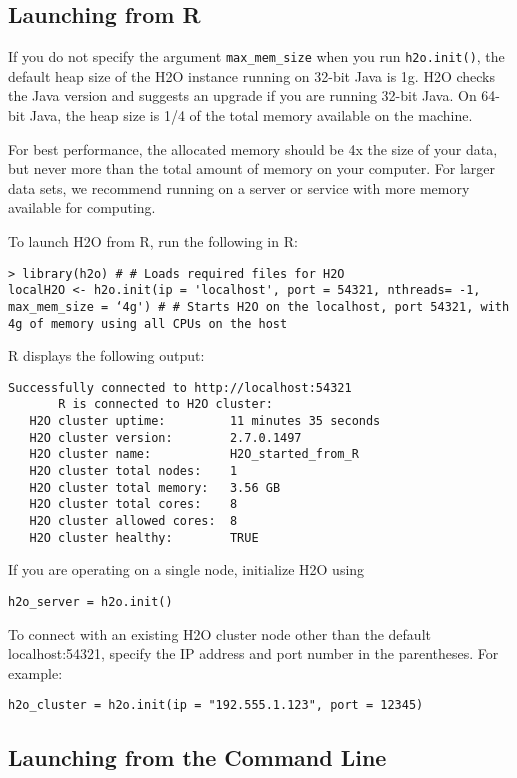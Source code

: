 \subsection{Launching from R}

If you do not specify the argument {\texttt{max\_mem\_size}} when you run {\texttt{h2o.init()}}, the default heap size of the H2O instance running on 32-bit Java is 1g. H2O checks the Java version and suggests an upgrade if you are running 32-bit Java. On 64-bit Java, the heap size is 1/4 of the total memory available on the machine. 

For best performance, the allocated memory should be 4x the size of your data, but never more than the total amount of memory on your computer. For larger data sets, we recommend running on a server or service with more memory available for computing.


To launch H2O from R, run the following in R:
\begin{lstlisting}[style=R]
> library(h2o) # # Loads required files for H2O
localH2O <- h2o.init(ip = 'localhost', port = 54321, nthreads= -1, max_mem_size = ‘4g') # # Starts H2O on the localhost, port 54321, with 4g of memory using all CPUs on the host 
\end{lstlisting} 


R displays the following output: 
\begin{lstlisting}[style=R]
Successfully connected to http://localhost:54321
       R is connected to H2O cluster:
   H2O cluster uptime:         11 minutes 35 seconds
   H2O cluster version:        2.7.0.1497
   H2O cluster name:           H2O_started_from_R
   H2O cluster total nodes:    1
   H2O cluster total memory:   3.56 GB
   H2O cluster total cores:    8
   H2O cluster allowed cores:  8
   H2O cluster healthy:        TRUE
\end{lstlisting}

If you are operating on a single node, initialize H2O using 
\begin{lstlisting}[style=R] 
h2o_server = h2o.init()
\end{lstlisting}


To connect with an existing H2O cluster node other than the default localhost:54321, specify the IP address and port number in the parentheses. For example: \begin{lstlisting}[style=R]
h2o_cluster = h2o.init(ip = "192.555.1.123", port = 12345)
\end{lstlisting}


\subsection{Launching from the Command Line}

